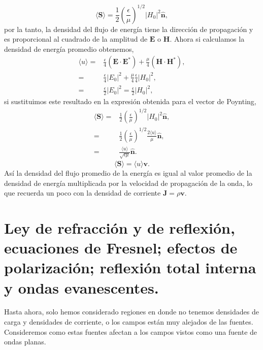 \documentclass[11pt,fleqn]{book} %
\begin{document}
\begin{example}
\begin{equation*}
\langle \textbf{S} \rangle=\frac{1}{2}\left(\frac{\epsilon}{\mu}\right)^{1/2}|H_0|^2 \hat{\textbf{n}},
\end{equation*}
 por la tanto, la densidad del flujo de energ\'ia tiene la direcci\'on de propagaci\'on y es proporcional al cuadrado de la amplitud de $\textbf{E}$ o $\textbf{H}$. Ahora si calculamos la densidad de energ\'ia promedio obtenemos,
\begin{equation*}
\begin{split}
\langle u \rangle =&\frac{\epsilon}{4}(\textbf{E}\cdot\textbf{E}^{*})+\frac{\mu}{4}(\textbf{H}\cdot\textbf{H}^{*}),\\
=&\frac{\epsilon}{4}|E_0|^2+\frac{\mu}{4}\frac{\epsilon}{4}|H_0|^2,\\
=&\frac{\epsilon}{2}|E_0|^2=\frac{\epsilon}{2}|H_0|^2,
\end{split}
\end{equation*}
si sustituimos este resultado en la expresi\'on obtenida para el vector de Poynting,
\begin{equation*}
\begin{split}
\langle \textbf{S} \rangle=&\frac{1}{2}\left(\frac{\epsilon}{\mu}\right)^{1/2}|H_0|^2 \hat{\textbf{n}},\\
=&\frac{1}{2}\left(\frac{\epsilon}{\mu}\right)^{1/2}\frac{2\langle u \rangle}{\mu} \hat{\textbf{n}},\\
=&\frac{\langle u \rangle}{\sqrt{\epsilon\mu}}\hat{\textbf{n}}.
\end{split}
\end{equation*}
\begin{equation}
\langle \textbf{S} \rangle=\langle u \rangle \textbf{v}.
\end{equation}
As\'i la densidad del flujo promedio de la energ\'ia es igual al valor promedio de la densidad de energ\'ia multiplicada por la velocidad de propagaci\'on de la onda, lo que recuerda un poco con la densidad de corriente $\textbf{J}=\rho \textbf{v}$.

\end{example}

\section{Ley de refracci\'on y de reflexi\'on, ecuaciones de Fresnel; efectos de polarizaci\'on; reflexi\'on total interna y ondas evanescentes.}
Hasta ahora, solo hemos considerado regiones en donde no tenemos densidades de carga y densidades de corriente, o los campos est\'an muy alejados de las fuentes. Consideremos como estas fuentes afectan a los campos vistos como una fuente de ondas planas.
\end{document}
